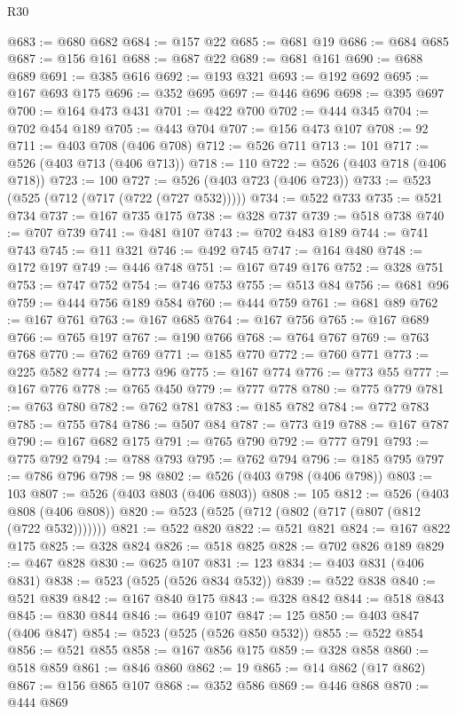 \begin{lexlean}{R30}
\begin{coremodule}
@683 := @680 @682
@684 := @157 @22
@685 := @681 @19
@686 := @684 @685
@687 := @156 @161
@688 := @687 @22
@689 := @681 @161
@690 := @688 @689
@691 := @385 @616
@692 := @193 @321
@693 := @192 @692
@695 := @167 @693 @175
@696 := @352 @695
@697 := @446 @696
@698 := @395 @697
@700 := @164 @473 @431
@701 := @422 @700
@702 := @444 @345
@704 := @702 @454 @189
@705 := @443 @704
@707 := @156 @473 @107
@708 := 92
@711 := @403 @708 (@406 @708)
@712 := @526 @711
@713 := 101
@717 := @526 (@403 @713 (@406 @713))
@718 := 110
@722 := @526 (@403 @718 (@406 @718))
@723 := 100
@727 := @526 (@403 @723 (@406 @723))
@733 := @523 (@525 (@712 (@717 (@722 (@727 @532)))))
@734 := @522 @733
@735 := @521 @734
@737 := @167 @735 @175
@738 := @328 @737
@739 := @518 @738
@740 := @707 @739
@741 := @481 @107
@743 := @702 @483 @189
@744 := @741 @743
@745 := @11 @321
@746 := @492 @745
@747 := @164 @480
@748 := @172 @197
@749 := @446 @748
@751 := @167 @749 @176
@752 := @328 @751
@753 := @747 @752
@754 := @746 @753
@755 := @513 @84
@756 := @681 @96
@759 := @444 @756 @189 @584
@760 := @444 @759
@761 := @681 @89
@762 := @167 @761
@763 := @167 @685
@764 := @167 @756
@765 := @167 @689
@766 := @765 @197
@767 := @190 @766
@768 := @764 @767
@769 := @763 @768
@770 := @762 @769
@771 := @185 @770
@772 := @760 @771
@773 := @225 @582
@774 := @773 @96
@775 := @167 @774
@776 := @773 @55
@777 := @167 @776
@778 := @765 @450
@779 := @777 @778
@780 := @775 @779
@781 := @763 @780
@782 := @762 @781
@783 := @185 @782
@784 := @772 @783
@785 := @755 @784
@786 := @507 @84
@787 := @773 @19
@788 := @167 @787
@790 := @167 @682 @175
@791 := @765 @790
@792 := @777 @791
@793 := @775 @792
@794 := @788 @793
@795 := @762 @794
@796 := @185 @795
@797 := @786 @796
@798 := 98
@802 := @526 (@403 @798 (@406 @798))
@803 := 103
@807 := @526 (@403 @803 (@406 @803))
@808 := 105
@812 := @526 (@403 @808 (@406 @808))
@820 := @523 (@525 (@712 (@802 (@717 (@807 (@812 (@722 @532)))))))
@821 := @522 @820
@822 := @521 @821
@824 := @167 @822 @175
@825 := @328 @824
@826 := @518 @825
@828 := @702 @826 @189
@829 := @467 @828
@830 := @625 @107
@831 := 123
@834 := @403 @831 (@406 @831)
@838 := @523 (@525 (@526 @834 @532))
@839 := @522 @838
@840 := @521 @839
@842 := @167 @840 @175
@843 := @328 @842
@844 := @518 @843
@845 := @830 @844
@846 := @649 @107
@847 := 125
@850 := @403 @847 (@406 @847)
@854 := @523 (@525 (@526 @850 @532))
@855 := @522 @854
@856 := @521 @855
@858 := @167 @856 @175
@859 := @328 @858
@860 := @518 @859
@861 := @846 @860
@862 := 19
@865 := @14 @862 (@17 @862)
@867 := @156 @865 @107
@868 := @352 @586
@869 := @446 @868
@870 := @444 @869

\end{coremodule}
\end{lexlean}
